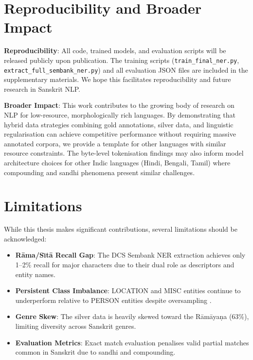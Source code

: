 \section{Reproducibility and Broader Impact}

\textbf{Reproducibility}: All code, trained models, and evaluation scripts will be released publicly upon publication. The training scripts (\texttt{train\_final\_ner.py}, \texttt{extract\_full\_sembank\_ner.py}) and all evaluation JSON files are included in the supplementary materials. We hope this facilitates reproducibility and future research in Sanskrit NLP.

\textbf{Broader Impact}: This work contributes to the growing body of research on NLP for low-resource, morphologically rich languages. By demonstrating that hybrid data strategies combining gold annotations, silver data, and linguistic regularisation can achieve competitive performance without requiring massive annotated corpora, we provide a template for other languages with similar resource constraints. The byte-level tokenisation findings may also inform model architecture choices for other Indic languages (Hindi, Bengali, Tamil) where compounding and sandhi phenomena present similar challenges.

\section{Limitations}

While this thesis makes significant contributions, several limitations should be acknowledged:

\begin{itemize}
    \item \textbf{R\={a}ma/S\={\i}t\={a} Recall Gap}: The DCS Sembank \cite{hellwig2010dcs} NER extraction achieves only 1--2\% recall for major characters due to their dual role as descriptors and entity names.
    \item \textbf{Persistent Class Imbalance}: LOCATION and MISC entities continue to underperform relative to PERSON entities despite oversampling \cite{chawla2002smote}.
    \item \textbf{Genre Skew}: The silver data is heavily skewed toward the Rāmāyaṇa \cite{ramayana} (63\%), limiting diversity across Sanskrit genres.
    \item \textbf{Evaluation Metrics}: Exact match evaluation \cite{tjong2003conll} penalises valid partial matches common in Sanskrit due to sandhi and compounding.
\end{itemize}

